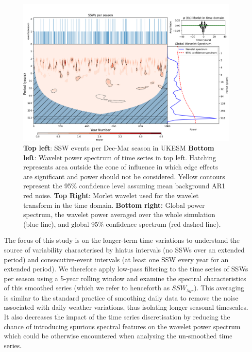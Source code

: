 \begin{figure}[h!]
\begin{center}
\noindent\includegraphics[width = 0.8\linewidth]{Figures/Figures-origins/SSW_wavelet.png}
\caption{\textbf{Top left}: SSW events per Dec-Mar season in UKESM \textbf{Bottom left}: Wavelet power spectrum of time series in top left. Hatching represents area outside the cone of influence in which edge effects are significant and power should not be considered. Yellow contours represent the 95\% confidence level assuming mean background AR1 red noise. \textbf{Top Right}: Morlet wavelet used for the wavelet transform in the time domain. \textbf{Bottom right:} Global power spectrum, the wavelet power averaged over the whole simulation (blue line), and global 95\% confidence spectrum (red dashed line).}
\label{fig:SSW_series_wavelet}
\end{center}
\end{figure}


The focus of this study is on the longer-term time variations to understand the source of variability characterised by hiatus intervals (no SSWs over an extended period) and consecutive-event intervals (at least one SSW every year for an extended period). We therefore apply low-pass filtering to the time series of SSWs per season using a 5-year rolling window and examine the spectral characteristics of this smoothed series (which we refer to henceforth as $SSW_{5yr}$). This averaging is similar to the standard practice of smoothing daily data to remove the noise associated with daily weather variations, thus isolating longer seasonal timescales. It also decreases the impact of the time series discretisation by reducing the chance of introducing spurious spectral features on the wavelet power spectrum which could be otherwise encountered when analysing the un-smoothed time series.  

